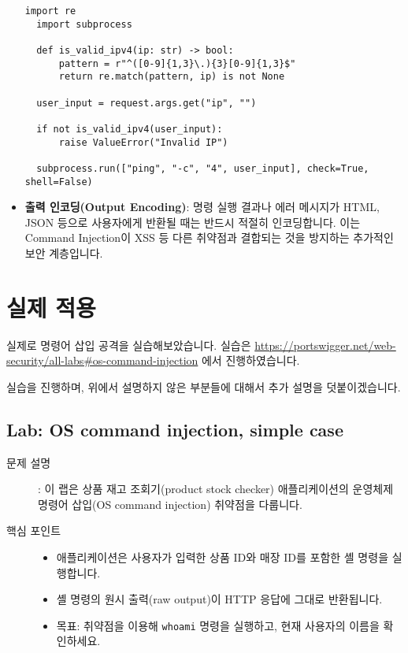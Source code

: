 \documentclass{article}
\begin{document}
\begin{itemize}
  \begin{lstlisting}[caption={Python: subprocess.run 사용 (shell=False). 입력 검증 포함}]
  import re
  import subprocess

  def is_valid_ipv4(ip: str) -> bool:
      pattern = r"^([0-9]{1,3}\.){3}[0-9]{1,3}$"
      return re.match(pattern, ip) is not None

  user_input = request.args.get("ip", "")

  if not is_valid_ipv4(user_input):
      raise ValueError("Invalid IP")

  subprocess.run(["ping", "-c", "4", user_input], check=True, shell=False)
  \end{lstlisting}

  \item \textbf{출력 인코딩(Output Encoding)}:  
  명령 실행 결과나 에러 메시지가 HTML, JSON 등으로 사용자에게 반환될 때는 반드시 적절히 인코딩합니다.  
  이는 Command Injection이 XSS 등 다른 취약점과 결합되는 것을 방지하는 추가적인 보안 계층입니다.
\end{itemize}

\section*{실제 적용}
실제로 명령어 삽입 공격을 실습해보았습니다. 실습은 \url{https://portswigger.net/web-security/all-labs#os-command-injection} 에서 진행하였습니다.

실습을 진행하며, 위에서 설명하지 않은 부분들에 대해서 추가 설명을 덧붙이겠습니다.

\subsection*{Lab: OS command injection, simple case}
\begin{description}
  \item[문제 설명]: 이 랩은 상품 재고 조회기(product stock checker) 애플리케이션의 운영체제 명령어 삽입(OS command injection) 취약점을 다룹니다.
  \item[핵심 포인트]
  
    \begin{itemize}
      \item 애플리케이션은 사용자가 입력한 상품 ID와 매장 ID를 포함한 셸 명령을 실행합니다.
      \item 셸 명령의 원시 출력(raw output)이 HTTP 응답에 그대로 반환됩니다.
      \item 목표: 취약점을 이용해 \texttt{whoami} 명령을 실행하고, 현재 사용자의 이름을 확인하세요.
    \end{itemize}
    
\end{description}
\end{document}
